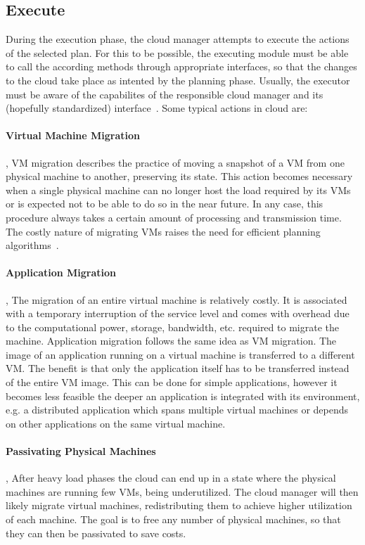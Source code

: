 \documentclass[a4paper]{llncs}
\begin{document}
\subsection{Execute}
During the execution phase, the cloud manager attempts to execute the actions of the selected plan. For this to be possible, the executing module must be able to call the according methods through appropriate interfaces, so that the changes to the cloud take place as intented by the planning phase. Usually, the executor must be aware of the capabilites of the responsible cloud manager and its (hopefully standardized) interface~\cite{Freitas10}.
Some typical actions in cloud are:

\paragraph{Virtual Machine Migration}, VM migration describes the practice of moving a snapshot of a VM from one physical machine to another, preserving its state. This action becomes necessary when a single physical machine can no longer host the load required by its VMs or is expected not to be able to do so in the near future. In any case, this procedure always takes a certain amount of processing and transmission time. The costly nature of migrating VMs raises the need for efficient planning algorithms~\cite{Zhao09}.

\paragraph{Application Migration}, The migration of an entire virtual machine is relatively costly. It is associated with a temporary interruption of the service level and comes with overhead due to the computational power, storage, bandwidth, etc. required to migrate the machine. Application migration follows the same idea as VM migration. The image of an application running on a virtual machine is transferred to a different VM. The benefit is that only the application itself has to be transferred instead of the entire VM image. This can be done for simple applications, however it becomes less feasible the deeper an application is integrated with its environment, e.g. a distributed application which spans multiple virtual machines or depends on other applications on the same virtual machine.

\paragraph{Passivating Physical Machines}, After heavy load phases the cloud can end up in a state where the physical machines are running few VMs, being underutilized. The cloud manager will then likely migrate virtual machines, redistributing them to achieve higher utilization of each machine. The goal is to free any number of physical machines, so that they can then be passivated to save costs.
\end{document}
